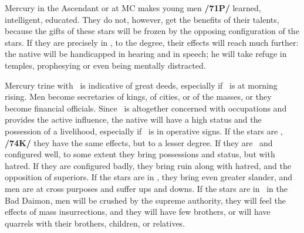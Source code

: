 Mercury in the Ascendant or at MC makes young men \textbf{/71P/} learned, intelligent, educated. They do
not, however, get the benefits of their talents, because the gifts of these stars will be frozen by the opposing configuration of the stars. If they are precisely in \Opposition, to the \mned degree, their effects will reach much further: the native will be handicapped in hearing and in speech; he will take refuge in temples, prophesying
or even being mentally distracted.

Mercury \marginnote{\Mercury \Trine \Jupiter} trine with \Jupiter\, is indicative of great deeds, especially if \Mercury\, is at morning rising. Men become secretaries of kings, of cities, or of the masses, or they become financial officials. Since \Mercury\, is
altogether concerned with occupations and provides the active influence, the native will have a high status and the possession of a livelihood, especially if \Mercury\, is in operative signs. If the stars are \Sextile, \textbf{/74K/}
they have the same effects, but to a lesser degree. If they are \Square\, and configured well, to some extent
they bring possessions and status, but with hatred. If they are configured badly, they bring ruin along with hatred, and the opposition of superiors. If the stars are in \Opposition, they bring even greater slander, and men are at cross purposes and suffer ups and downs. If the stars are in \Opposition\, in the Bad Daimon, men will be crushed by the supreme authority, they will feel the effects of mass insurrections, and they will have few brothers, or will have quarrels with their brothers, children, or relatives.

